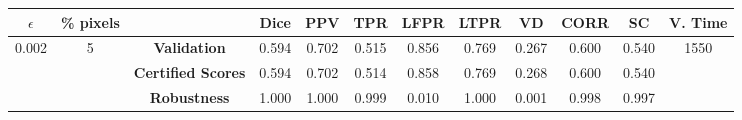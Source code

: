 \begin{longtable}{ c  c | c | c  c  c  c  c  c  c c c}
\toprule \textbf{$\epsilon$} & \textbf{\% pixels} & & \textbf{Dice} & \textbf{PPV} & \textbf{TPR} & \textbf{LFPR} & \textbf{LTPR} & \textbf{VD} & \textbf{CORR} & \textbf{SC} & \textbf{V. Time} \\
\midrule 
\multirow{3}{*}{0.002}  & \multirow{3}{*}{5} &\textbf{Validation} & 0.594 & 0.702 & 0.515 & 0.856 & 0.769 & 0.267 & 0.600 & 0.540 & \multirow{3}{*}{1550} \\
 & & \textbf{Certified Scores} & 0.594 & 0.702 & 0.514 & 0.858 & 0.769 & 0.268 & 0.600 & 0.540 & \\
& & \textbf{Robustness} & 1.000 & 1.000 & 0.999 & 0.010 & 1.000 & 0.001 & 0.998 & 0.997 & \\
\end{longtable}